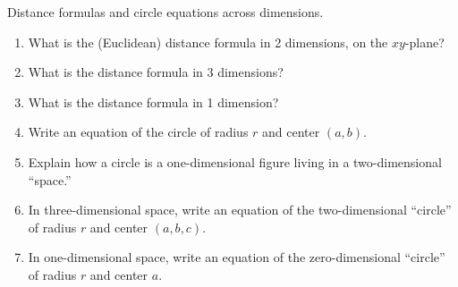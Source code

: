\begin{prob}
Distance formulas and circle equations across dimensions.  
\begin{enumerate}
\item What is the (Euclidean) distance formula in 2 dimensions, on the $xy$-plane?  
\item What is the distance formula in 3 dimensions?
\item What is the distance formula in 1 dimension?
\item Write an equation of the circle of radius $r$ and center $(a, b)$.  
\item Explain how a circle is a one-dimensional figure living in a two-dimensional ``space.''
\item In three-dimensional space, write an equation of the two-dimensional ``circle'' of radius $r$ and center $(a, b, c)$.  
\item In one-dimensional space, write an equation of the zero-dimensional ``circle'' of radius $r$ and center $a$.  
\end{enumerate}
\end{prob}

%

